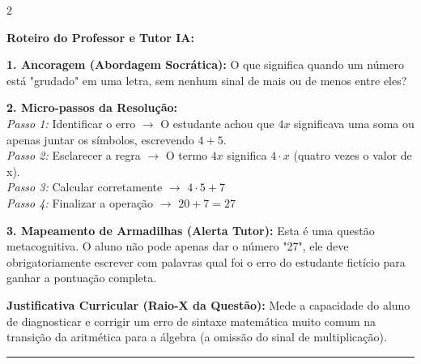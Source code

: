 \begin{multicols*}{2}
\ifgabarito
    \begin{tcolorbox}[colback=CorTitUm!5, colframe=CorTitUm, boxrule=1pt, arc=4pt, left=6pt, right=6pt, top=6pt, bottom=6pt]
    \small\textbf{\textcolor{CorTitUm}{Roteiro do Professor e Tutor IA:}}\par\vspace{0.1cm}
    \color{CinzaEscuro}
    \textbf{1. Ancoragem (Abordagem Socrática):} O que significa quando um número está "grudado" em uma letra, sem nenhum sinal de mais ou de menos entre eles?\par\vspace{0.1cm}
    
    \textbf{2. Micro-passos da Resolução:}\\
    \textit{Passo 1:} Identificar o erro $\rightarrow$ O estudante achou que $4x$ significava uma soma ou apenas juntar os símbolos, escrevendo $4+5$.\\
    \textit{Passo 2:} Esclarecer a regra $\rightarrow$ O termo $4x$ significa $4 \cdot x$ (quatro vezes o valor de x).\\
    \textit{Passo 3:} Calcular corretamente $\rightarrow$ $ 4 \cdot 5 + 7 $\\
    \textit{Passo 4:} Finalizar a operação $\rightarrow$ $ 20 + 7 = 27 $\par\vspace{0.1cm}
    
    \textbf{3. Mapeamento de Armadilhas (Alerta Tutor):} Esta é uma questão metacognitiva. O aluno não pode apenas dar o número "27", ele deve obrigatoriamente escrever com palavras qual foi o erro do estudante fictício para ganhar a pontuação completa.
    \end{tcolorbox}
    \vspace{0.15cm}
    
    \begin{boxexplicacao}
    \textbf{Justificativa Curricular (Raio-X da Questão):} Mede a capacidade do aluno de diagnosticar e corrigir um erro de sintaxe matemática muito comum na transição da aritmética para a álgebra (a omissão do sinal de multiplicação).
    \end{boxexplicacao}
\fi

\par\vspace{\espacoQuestao}

\noindent\textcolor{CorLinha}{\rule{\linewidth}{0.5pt}} 
\par\vspace{\espacoPreQuestao}

\end{multicols*}
